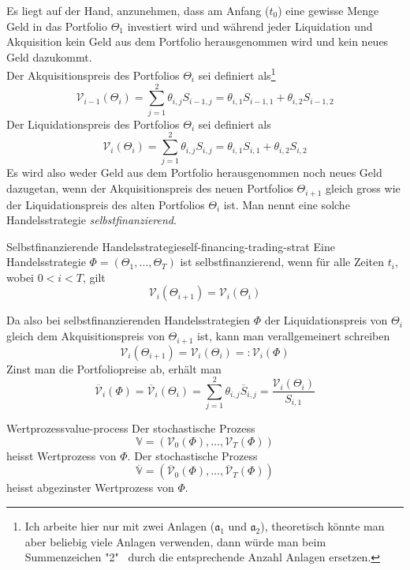 \documentclass[11pt]{report} %
\begin{document}
Es liegt auf der Hand, anzunehmen, dass am Anfang ($t_0$) eine gewisse Menge Geld in das Portfolio $\Theta_1$ investiert wird und während jeder Liquidation und Akquisition kein Geld aus dem Portfolio herausgenommen wird und kein neues Geld dazukommt.
\\Der Akquisitionspreis des Portfolios $\Theta_i$ sei definiert als\footnote{Ich arbeite hier nur mit zwei Anlagen ($\mathfrak{a}_1$ und $\mathfrak{a}_2$), theoretisch könnte man aber beliebig viele Anlagen verwenden, dann würde man beim Summenzeichen "2" \ durch die entsprechende Anzahl Anlagen ersetzen.} $$\mathcal{V}_{i-1}(\Theta_i)=\sum_{j=1}^{2}\theta_{i, j}S_{i-1, j}=\theta_{i, 1}S_{i-1, 1}+\theta_{i, 2}S_{i-1, 2}$$
Der Liquidationspreis des Portfolios $\Theta_i$ sei definiert als $$\mathcal{V}_{i}(\Theta_i)=\sum_{j=1}^{2}\theta_{i, j}S_{i, j}=\theta_{i, 1}S_{i, 1}+\theta_{i, 2}S_{i, 2}$$
Es wird also weder Geld aus dem Portfolio herausgenommen noch neues Geld dazugetan, wenn der Akquisitionspreis des neuen Portfolios $\Theta_{i+1}$ gleich gross wie der Liquidationspreis des alten Portfolios $\Theta_i$ ist. Man nennt eine solche Handelsstrategie \textit{selbstfinanzierend}.
\begin{Definition}{Selbstfinanzierende Handelsstrategie}{self-financing-trading-strat}
Eine Handelsstrategie $\Phi=(\Theta_1, \ldots, \Theta_T)$ ist selbstfinanzierend, wenn für alle Zeiten $t_i$, wobei $0<i<T$, gilt $$\mathcal{V}_i(\Theta_{i+1})=\mathcal{V}_i(\Theta_i)$$
\end{Definition}
Da also bei selbstfinanzierenden Handelsstrategien $\Phi$ der Liquidationspreis von $\Theta_i$ gleich dem Akquisitionspreis von $\Theta_{i+1}$ ist, kann man verallgemeinert schreiben $$\mathcal{V}_i(\Theta_{i+1})=\mathcal{V}_i(\Theta_i)=:\mathcal{V}_i(\Phi)$$
Zinst man die Portfoliopreise ab, erhält man $$\overline{\mathcal{V}}_{i}(\Phi)=\overline{\mathcal{V}}_{i}(\Theta_i)=\sum_{j=1}^{2}\theta_{i, j}\overline{S}_{i, j}=\frac{\mathcal{V}_i(\Theta_i)}{S_{i, 1}}$$
\begin{Definition}{Wertprozess}{value-process}
    Der stochastische Prozess $$\mathbb{V}=(\mathcal{V}_0(\Phi), \ldots, \mathcal{V}_T(\Phi))$$ heisst Wertprozess von $\Phi$. Der stochastische Prozess $$\overline{\mathbb{V}}=(\overline{\mathcal{V}}_0(\Phi), \ldots, \overline{\mathcal{V}}_T(\Phi))$$ heisst abgezinster Wertprozess von $\Phi$.
\end{Definition}
\end{document}
